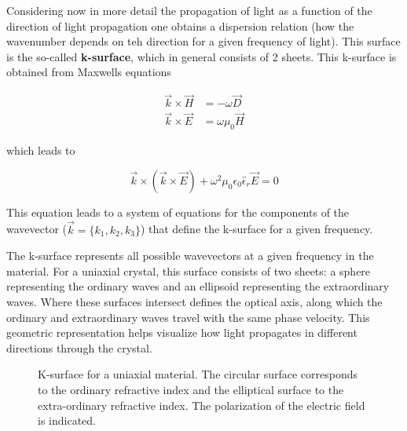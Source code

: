 \documentclass[
  a4paper,
]{book}
\begin{document}
Considering now in more detail the propagation of light as a function of
the direction of light propagation one obtains a dispersion relation
(how the wavenumber depends on teh direction for a given frequency of
light). This surface is the so-called \textbf{k-surface}, which in
general consists of 2 sheets. This k-surface is obtained from Maxwells
equations

\[
\begin{aligned}
\vec{k}\times \vec{H} & = -\omega \vec{D}\\
\vec{k}\times\vec{E} &=\omega \mu_0 \vec{H}
\end{aligned}
\]

which leads to

\[
\vec{k}\times(\vec{k}\times\vec{E})+\omega^2\mu_0 \epsilon_0 \overleftrightarrow{\epsilon_r} \vec{E}=0
\]

This equation leads to a system of equations for the components of the
wavevector (\(\vec{k}=\{k_1,k_2,k_3\}\)) that define the k-surface for a
given frequency.

The k-surface represents all possible wavevectors at a given frequency
in the material. For a uniaxial crystal, this surface consists of two
sheets: a sphere representing the ordinary waves and an ellipsoid
representing the extraordinary waves. Where these surfaces intersect
defines the optical axis, along which the ordinary and extraordinary
waves travel with the same phase velocity. This geometric representation
helps visualize how light propagates in different directions through the
crystal.

\begin{figure}


\caption{\label{fig-k-surface}K-surface for a uniaxial material. The
circular surface corresponds to the ordinary refractive index and the
elliptical surface to the extra-ordinary refractive index. The
polarization of the electric field is indicated.}

\end{figure}%
\end{document}
